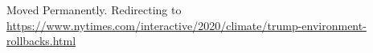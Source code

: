 Moved Permanently. Redirecting to
\url{https://www.nytimes.com/interactive/2020/climate/trump-environment-rollbacks.html}
